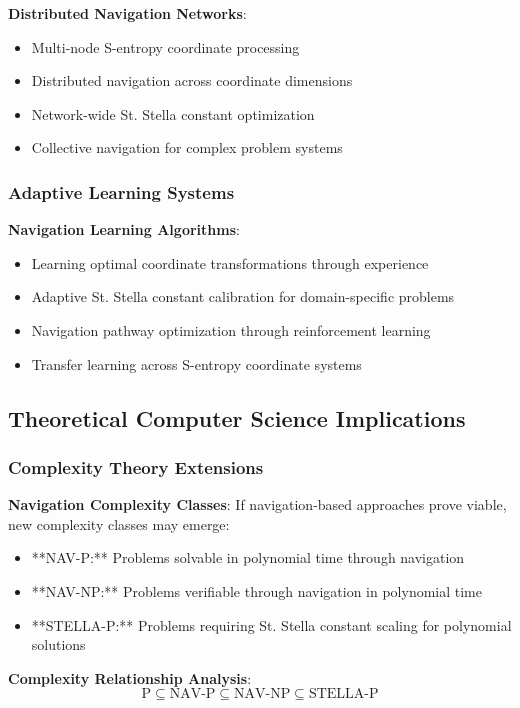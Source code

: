 \documentclass[11pt]{article}
\begin{document}
\textbf{Distributed Navigation Networks}:
\begin{itemize}
\item Multi-node S-entropy coordinate processing
\item Distributed navigation across coordinate dimensions
\item Network-wide St. Stella constant optimization
\item Collective navigation for complex problem systems
\end{itemize}

\subsubsection{Adaptive Learning Systems}

\textbf{Navigation Learning Algorithms}:
\begin{itemize}
\item Learning optimal coordinate transformations through experience
\item Adaptive St. Stella constant calibration for domain-specific problems
\item Navigation pathway optimization through reinforcement learning
\item Transfer learning across S-entropy coordinate systems
\end{itemize}

\subsection{Theoretical Computer Science Implications}

\subsubsection{Complexity Theory Extensions}

\textbf{Navigation Complexity Classes}:
If navigation-based approaches prove viable, new complexity classes may emerge:
\begin{itemize}
\item **NAV-P:** Problems solvable in polynomial time through navigation
\item **NAV-NP:** Problems verifiable through navigation in polynomial time
\item **STELLA-P:** Problems requiring St. Stella constant scaling for polynomial solutions
\end{itemize}

\textbf{Complexity Relationship Analysis}:
\begin{equation}
\text{P} \subseteq \text{NAV-P} \subseteq \text{NAV-NP} \subseteq \text{STELLA-P}
\label{eq:complexity_relationships}
\end{equation}
\end{document}

